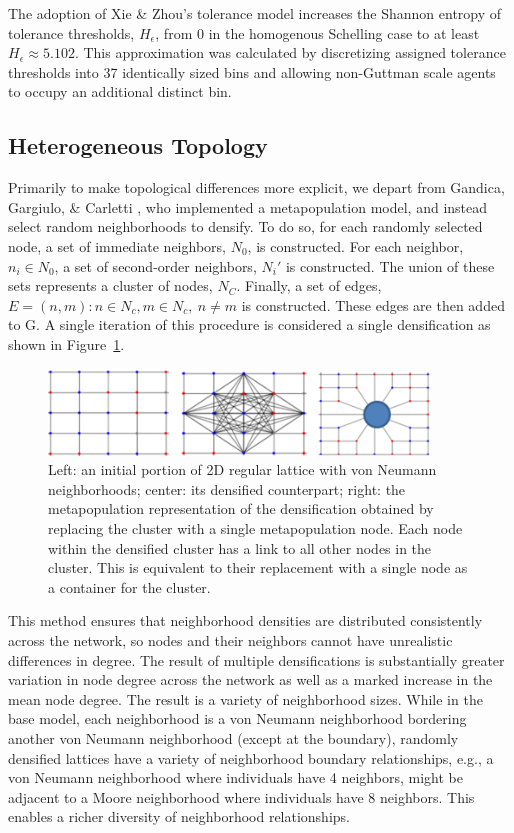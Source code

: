 \documentclass[a4paper]{article}
\begin{document}
The adoption of Xie \& Zhou’s tolerance model increases the Shannon entropy of tolerance thresholds, $H_\epsilon$, from $0$ in the homogenous Schelling case to at least $H_\epsilon\approx5.102$. This approximation was calculated by discretizing assigned tolerance thresholds into 37 identically sized bins and allowing non-Guttman scale agents to occupy an additional distinct bin.

\subsection{Heterogeneous Topology}

Primarily to make topological differences more explicit, we depart from Gandica, Gargiulo, \& Carletti \cite{gandica2016can}, who implemented a metapopulation model, and instead select random neighborhoods to densify.  To do so, for each randomly selected node, a set of immediate neighbors, $N_0$, is constructed.  For each neighbor, $n_i \in N_0$, a set of second-order neighbors, $N_i\prime$ is constructed.  The union of these sets represents a cluster of nodes, $N_C$. Finally, a set of edges, $E={\left(n,m\right):n\in N_c,m\in N_c,\ n\neq m}$ is constructed. These edges are then added to G.  A single iteration of this procedure is considered a single densification as shown in Figure~\ref*{fig:fig_s2}.

\begin{figure}[H]
    \centering
    \includegraphics[width=0.9\textwidth]{figs2.png}
    \caption{Left: an initial portion of 2D regular lattice with von Neumann neighborhoods; center: its densified counterpart; right: the metapopulation representation of the densification obtained by replacing the cluster with a single metapopulation node. Each node within the densified cluster has a link to all other nodes in the cluster. This is equivalent to their replacement with a single node as a container for the cluster.}
    \label{fig:fig_s2}
\end{figure}

This method ensures that neighborhood densities are distributed consistently across the network, so nodes and their neighbors cannot have unrealistic differences in degree.  The result of multiple densifications is substantially greater variation in node degree across the network as well as a marked increase in the mean node degree.  The result is a variety of neighborhood sizes. While in the base model, each neighborhood is a von Neumann neighborhood bordering another von Neumann neighborhood (except at the boundary), randomly densified lattices have a variety of neighborhood boundary relationships, e.g., a von Neumann neighborhood where individuals have 4 neighbors, might be adjacent to a Moore neighborhood where individuals have 8 neighbors.  This enables a richer diversity of neighborhood relationships. 
\end{document}
